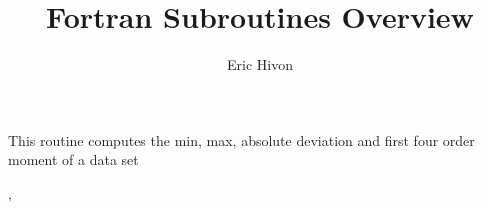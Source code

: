 
\sloppy


\title{\healpix Fortran Subroutines Overview}
 \section[compute\_statistics*]{ }
\label{sub:compute_statistics}
\author{Eric Hivon}

\newcommand{\myskip}{\hskip 1cm}

\begin{facility}
{This routine computes the min, max, absolute deviation and first four order moment of a data set}
{\modStatistics}
\end{facility}

\begin{f90format}
{%
 ,%
 }
\end{f90format}
\aboutoptional

